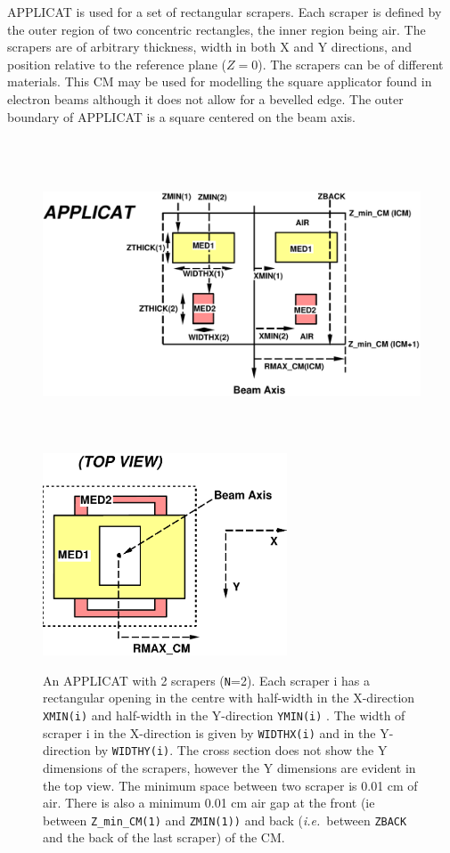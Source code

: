 \documentclass[12pt,twoside]{article}
\newcommand{\ie}{{\em i.e.}}
\begin{document}
APPLICAT is used for a set of rectangular scrapers. Each scraper is defined by
the outer region of two concentric rectangles, the inner region being air.  The
scrapers are of arbitrary thickness, width in both X and Y directions, and
position relative to the
reference plane ($Z = 0$). The scrapers can be  of different  materials.
This CM may be used for modelling the square applicator found in electron
beams although it does
not allow for a bevelled edge.  The outer boundary of APPLICAT is a square
centered on the beam axis.

\begin{figure}[htp]
\begin{center}
\leavevmode
\includegraphics[height=9.25cm]{figures/applicatd}
\end{center}
\vspace{-1.6cm}
\includegraphics[height=6cm]{figures/applicattop}
\caption[APPLICAT CM geometry]
{An APPLICAT with 2 scrapers ({\tt N}=2).  Each scraper i has a rectangular opening in
the centre with half-width in the X-direction {\tt XMIN(i)} and half-width in
the Y-direction {\tt YMIN(i)}
.  The width of scraper i in the
X-direction is given by
{\tt WIDTHX(i)} and in the Y-direction by {\tt WIDTHY(i)}.  The cross section does
not show the Y dimensions of the scrapers, however the Y dimensions are
evident in the top view.  The minimum space
between two scraper is 0.01
cm of air.  There is also a minimum 0.01 cm air gap at the front (ie
between {\tt Z\_min\_CM(1)}
 and {\tt ZMIN(1))} and back (\ie\ between {\tt ZBACK} and the back
of the last scraper) of
the CM.}
\label{fig_APPLICATD}
\end{figure}
\end{document}
